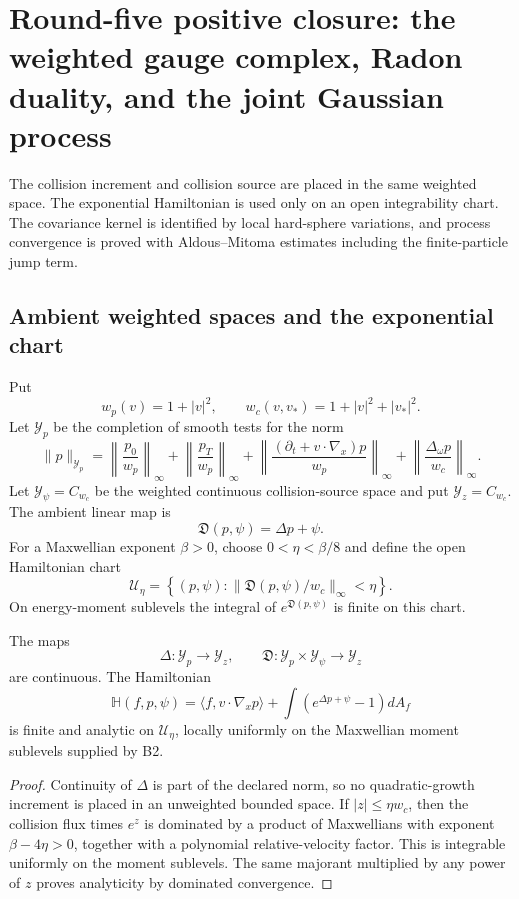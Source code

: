 \section{Round-five positive closure: the weighted gauge complex, Radon duality, and the joint Gaussian process}
\label{sec:r5-b3}

The collision increment and collision source are placed in the same weighted
space.  The exponential Hamiltonian is used only on an open integrability
chart.  The covariance kernel is identified by local hard-sphere variations,
and process convergence is proved with Aldous--Mitoma estimates including the
finite-particle jump term.

\subsection{Ambient weighted spaces and the exponential chart}

Put
\[
 w_p(v)=1+|v|^2,
 \qquad w_c(v,v_*)=1+|v|^2+|v_*|^2.
\]
Let \(\mathcal Y_p\) be the completion of smooth tests for the norm
\[
 \|p\|_{\mathcal Y_p}=
 \left\|\frac{p_0}{w_p}\right\|_\infty+
 \left\|\frac{p_T}{w_p}\right\|_\infty+
 \left\|\frac{(\partial_t+v\cdot\nabla_x)p}{w_p}\right\|_\infty+
 \left\|\frac{\Delta_\omega p}{w_c}\right\|_\infty.
\]
Let \(\mathcal Y_\psi=C_{w_c}\) be the weighted continuous collision-source
space and put \(\mathcal Y_z=C_{w_c}\).  The ambient linear map is
\[
 \mathfrak D(p,\psi)=\Delta p+\psi.
\]
For a Maxwellian exponent \(\beta>0\), choose \(0<\eta<\beta/8\) and define
the open Hamiltonian chart
\[
 \mathcal U_\eta=\left\{(p,\psi):
 \|\mathfrak D(p,\psi)/w_c\|_\infty<\eta\right\}.
\]
On energy-moment sublevels the integral of
\(e^{\mathfrak D(p,\psi)}\) is finite on this chart.

\begin{lemma}
\label{lem:r5-b3-typing}
The maps
\[
 \Delta:\mathcal Y_p\to\mathcal Y_z,
 \qquad
 \mathfrak D:\mathcal Y_p\times\mathcal Y_\psi\to\mathcal Y_z
\]
are continuous.  The Hamiltonian
\[
 \mathbb H(f,p,\psi)=
 \langle f,v\cdot\nabla_xp\rangle+
 \int(e^{\Delta p+\psi}-1)dA_f
\]
is finite and analytic on \(\mathcal U_\eta\), locally uniformly on the
Maxwellian moment sublevels supplied by B2.
\end{lemma}

\begin{proof}
Continuity of \(\Delta\) is part of the declared norm, so no quadratic-growth
increment is placed in an unweighted bounded space.  If
\(|z|\le\eta w_c\), then the collision flux times \(e^z\) is dominated by a
product of Maxwellians with exponent \(\beta-4\eta>0\), together with a
polynomial relative-velocity factor.  This is integrable uniformly on the
moment sublevels.  The same majorant multiplied by any power of \(z\) proves
analyticity by dominated convergence.
\end{proof}

